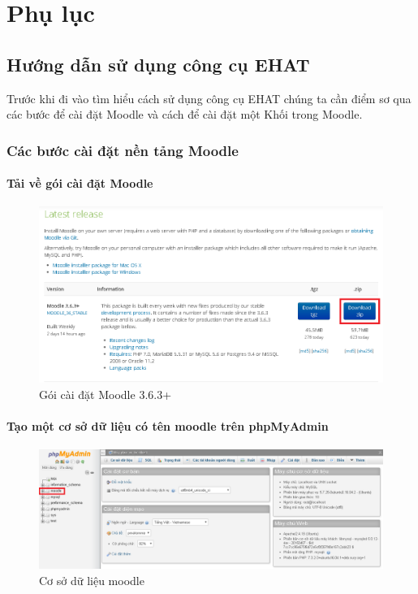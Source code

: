\chapter*{Phụ lục}
\section*{Hướng dẫn sử dụng công cụ EHAT}

Trước khi đi vào tìm hiểu cách sử dụng công cụ EHAT chúng ta cần điểm sơ qua các bước để cài đặt Moodle và cách để cài đặt một Khối trong Moodle.
\subsection*{Các bước cài đặt nền tảng Moodle}

\subsubsection*{Tải về gói cài đặt Moodle}

\begin{center}
	\begin{figure}[htp]
		\begin{center}
			\includegraphics[width=0.8\linewidth]{img/packagemoodle}
		\end{center}
		\caption{Gói cài đặt Moodle 3.6.3+}
		\label{refhinh28}
	\end{figure}
\end{center}

\vskip 10cm
\subsubsection*{Tạo một cơ sở dữ liệu có tên moodle trên phpMyAdmin}

\begin{center}
	\begin{figure}[htp]
		\begin{center}
			\includegraphics[width=1.3\linewidth]{img/dbmoodle}
		\end{center}
		\caption{Cơ sở dữ liệu moodle}
		\label{refhinh29}
	\end{figure}
\end{center}

